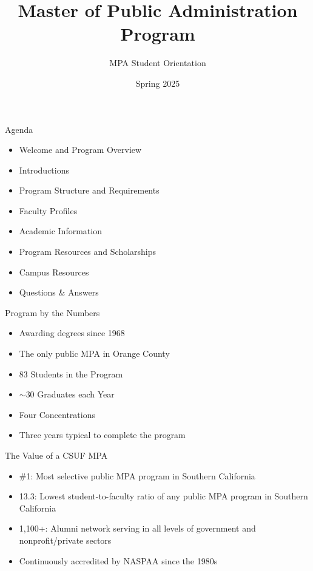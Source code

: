 \documentclass[10pt]{beamer}
\begin{document}
\title{Master of Public Administration Program}
\subtitle{MPA Student Orientation}
\date{Spring 2025}
\vspace{1cm}

\maketitle

\begin{frame}{Agenda}
\begin{itemize}
\item Welcome and Program Overview
\item Introductions
\item Program Structure and Requirements
\item Faculty Profiles
\item Academic Information
\item Program Resources and Scholarships
\item Campus Resources
\item Questions \& Answers
\end{itemize}
\end{frame}

\begin{frame}{Program by the Numbers}
\begin{itemize}
\item Awarding degrees since 1968
\item The only public MPA in Orange County
\item 83 Students in the Program
\item $\sim$30 Graduates each Year
\item Four Concentrations
\item Three years typical to complete the program
\end{itemize}
\end{frame}

\begin{frame}{The Value of a CSUF MPA}
\begin{itemize}
\item \#1: Most selective public MPA program in Southern California
\item 13.3: Lowest student-to-faculty ratio of any public MPA program in Southern California
\item 1,100+: Alumni network serving in all levels of government and nonprofit/private sectors
\item Continuously accredited by NASPAA since the 1980s
\end{itemize}
\end{frame}
\end{document}
